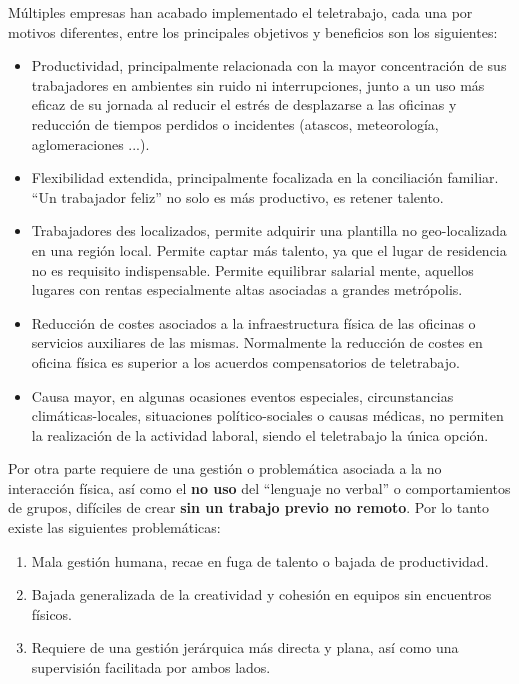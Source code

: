 Múltiples empresas han acabado implementado el teletrabajo, cada una por motivos diferentes\cite{c_work_remote_eurofound}, entre los principales objetivos y beneficios son los siguientes:
\begin{itemize}
    \item Productividad, principalmente relacionada con la mayor concentración de sus trabajadores en ambientes sin ruido ni interrupciones, junto a un uso más eficaz de su jornada al reducir el estrés de desplazarse a las oficinas y reducción de  tiempos perdidos o incidentes (atascos, meteorología, aglomeraciones ...).
    \item Flexibilidad extendida, principalmente focalizada en la conciliación familiar. “Un trabajador feliz” no solo es más productivo, es retener talento.
    \item Trabajadores des localizados, permite adquirir una plantilla no geo-localizada en una región local. Permite captar más talento, ya que el lugar de residencia no es requisito indispensable. Permite equilibrar salarial mente, aquellos lugares con rentas especialmente altas asociadas a grandes metrópolis.
    \item Reducción de costes asociados a la infraestructura física de las oficinas o servicios auxiliares de las mismas. Normalmente la reducción de costes en oficina física es superior a los acuerdos compensatorios de teletrabajo.
    \item Causa mayor, en algunas ocasiones eventos especiales, circunstancias climáticas-locales, situaciones político-sociales o causas médicas, no permiten la realización de la actividad laboral, siendo el teletrabajo la única opción.
\end{itemize}
Por otra parte requiere de una gestión o problemática asociada a la no interacción física, así como el \textbf{no uso} del “lenguaje no verbal” o comportamientos de grupos, difíciles de crear \textbf{sin un trabajo previo no remoto}. Por lo tanto existe las siguientes problemáticas:
\begin{enumerate}
    \item Mala gestión humana, recae en fuga de talento o bajada de productividad.
    \item Bajada generalizada de la creatividad y cohesión en equipos sin encuentros físicos.
    \item Requiere de una gestión jerárquica más directa y plana, así como una supervisión facilitada por ambos lados.
\end{enumerate}

